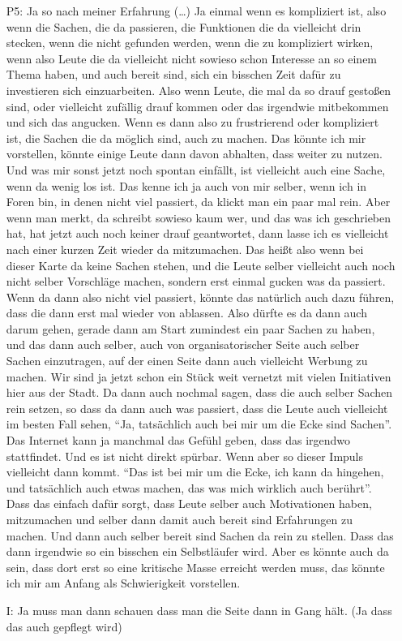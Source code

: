 \begin{itemize}
    \item[P5:] Ja so nach meiner Erfahrung (\dots) Ja einmal wenn es kompliziert ist, also wenn die Sachen, die da passieren, die Funktionen die da vielleicht drin stecken, wenn die nicht gefunden werden, wenn die zu kompliziert wirken, wenn also Leute die da vielleicht nicht sowieso schon Interesse an so einem Thema haben, und auch bereit sind, sich ein bisschen Zeit daf{\"u}r zu investieren sich einzuarbeiten. Also wenn Leute, die mal da so drauf gesto{\ss}en sind, oder vielleicht zuf{\"a}llig drauf kommen oder das irgendwie mitbekommen und sich das angucken. Wenn es dann also zu frustrierend oder kompliziert ist, die Sachen die da m{\"o}glich sind, auch zu machen. Das k{\"o}nnte ich mir vorstellen, k{\"o}nnte einige Leute dann davon abhalten, dass weiter zu nutzen. Und was mir sonst jetzt noch spontan einf{\"a}llt, ist vielleicht auch eine Sache, wenn da wenig los ist. Das kenne ich ja auch von mir selber, wenn ich in Foren bin, in denen nicht viel passiert, da klickt man ein paar mal rein. Aber wenn man merkt, da schreibt sowieso kaum wer, und das was ich geschrieben hat, hat jetzt auch noch keiner drauf geantwortet, dann lasse ich es vielleicht nach einer kurzen Zeit wieder da mitzumachen. Das hei{\ss}t also wenn bei dieser Karte da keine Sachen stehen, und die Leute selber vielleicht auch noch nicht selber Vorschl{\"a}ge machen, sondern erst einmal gucken was da passiert. Wenn da dann also nicht viel passiert, k{\"o}nnte das nat{\"u}rlich auch dazu f{\"u}hren, dass die dann erst mal wieder von ablassen. Also d{\"u}rfte es da dann auch darum gehen, gerade dann am Start zumindest ein paar Sachen zu haben, und das dann auch selber, auch von organisatorischer Seite auch selber Sachen einzutragen, auf der einen Seite dann auch vielleicht Werbung zu machen. Wir sind ja jetzt schon ein St{\"u}ck weit vernetzt mit vielen Initiativen hier aus der Stadt. Da dann auch nochmal sagen, dass die auch selber Sachen rein setzen, so dass da dann auch was passiert, dass die Leute auch vielleicht im besten Fall sehen, "`Ja, tats{\"a}chlich auch bei mir um die Ecke sind Sachen"'. Das Internet kann ja manchmal das Gef{\"u}hl geben, dass das irgendwo stattfindet. Und es ist nicht direkt sp{\"u}rbar. Wenn aber so dieser Impuls vielleicht dann kommt. "`Das ist bei mir um die Ecke, ich kann da hingehen, und tats{\"a}chlich auch etwas machen, das was mich wirklich auch ber{\"u}hrt"'. Dass das einfach daf{\"u}r sorgt, dass Leute selber auch Motivationen haben, mitzumachen und selber dann damit auch bereit sind Erfahrungen zu machen. Und dann auch selber bereit sind Sachen da rein zu stellen. Dass das dann irgendwie so ein bisschen ein Selbstl{\"a}ufer wird. Aber es k{\"o}nnte auch da sein, dass dort erst so eine kritische Masse erreicht werden muss, das k{\"o}nnte ich mir am Anfang als Schwierigkeit vorstellen.
    \item[I:] Ja muss man dann schauen dass man die Seite dann in Gang h{\"a}lt. (Ja dass das auch gepflegt wird)
\end{itemize}

